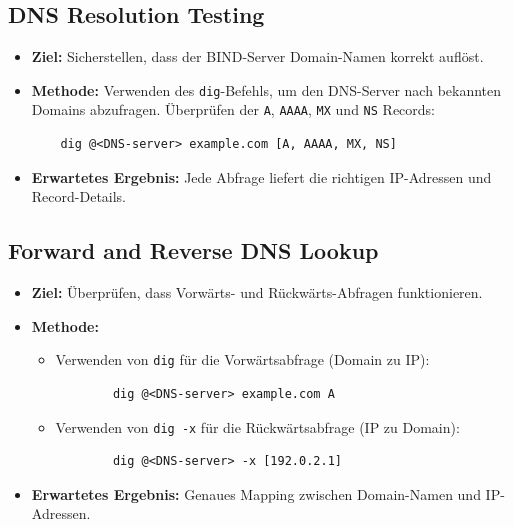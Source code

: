 \documentclass[a4paper,12pt]{article}
\begin{document}
\subsection*{DNS Resolution Testing}
\begin{itemize}[leftmargin=1.5cm]
	\item \textbf{Ziel:} Sicherstellen, dass der BIND-Server Domain-Namen korrekt auflöst.
	\item \textbf{Methode:} Verwenden des \texttt{dig}-Befehls, um den DNS-Server nach bekannten Domains abzufragen. Überprüfen der \texttt{A}, \texttt{AAAA}, \texttt{MX} und \texttt{NS} Records:
	      \begin{verbatim}
    dig @<DNS-server> example.com [A, AAAA, MX, NS]
    \end{verbatim}
	\item \textbf{Erwartetes Ergebnis:} Jede Abfrage liefert die richtigen IP-Adressen und Record-Details.
\end{itemize}

\subsection*{Forward and Reverse DNS Lookup}
\begin{itemize}[leftmargin=1.5cm]
	\item \textbf{Ziel:} Überprüfen, dass Vorwärts- und Rückwärts-Abfragen funktionieren.
	\item \textbf{Methode:}
	      \begin{itemize}
		      \item Verwenden von \texttt{dig} für die Vorwärtsabfrage (Domain zu IP):
		            \begin{verbatim}
        dig @<DNS-server> example.com A
        \end{verbatim}
		      \item Verwenden von \texttt{dig -x} für die Rückwärtsabfrage (IP zu Domain):
		            \begin{verbatim}
        dig @<DNS-server> -x [192.0.2.1]
        \end{verbatim}
	      \end{itemize}
	\item \textbf{Erwartetes Ergebnis:} Genaues Mapping zwischen Domain-Namen und IP-Adressen.
\end{itemize}
\end{document}
